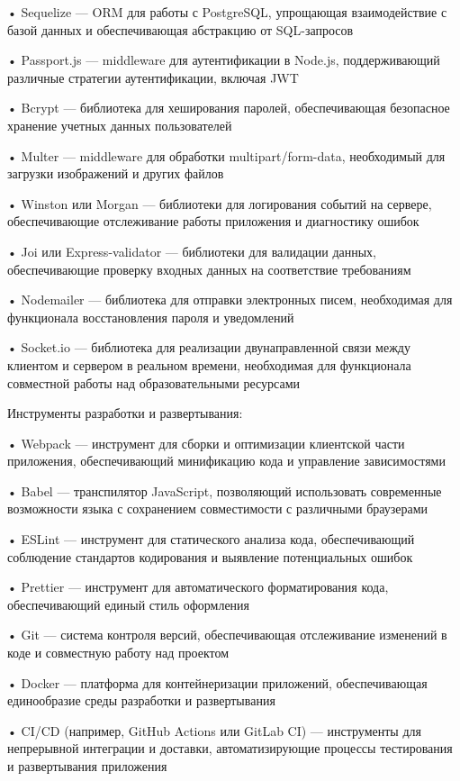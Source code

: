 {  \par \redline • Sequelize — ORM для работы с PostgreSQL, упрощающая взаимодействие с базой данных и обеспечивающая абстракцию от SQL-запросов
  \par \redline • Passport.js — middleware для аутентификации в Node.js, поддерживающий различные стратегии аутентификации, включая JWT
  \par \redline • Bcrypt — библиотека для хеширования паролей, обеспечивающая безопасное хранение учетных данных пользователей
  \par \redline • Multer — middleware для обработки multipart/form-data, необходимый для загрузки изображений и других файлов
  \par \redline • Winston или Morgan — библиотеки для логирования событий на сервере, обеспечивающие отслеживание работы приложения и диагностику ошибок
  \par \redline • Joi или Express-validator — библиотеки для валидации данных, обеспечивающие проверку входных данных на соответствие требованиям
  \par \redline • Nodemailer — библиотека для отправки электронных писем, необходимая для функционала восстановления пароля и уведомлений
  \par \redline • Socket.io — библиотека для реализации двунаправленной связи между клиентом и сервером в реальном времени, необходимая для функционала совместной работы над образовательными ресурсами

  \par \redline Инструменты разработки и развертывания:

  \par \redline • Webpack — инструмент для сборки и оптимизации клиентской части приложения, обеспечивающий минификацию кода и управление зависимостями
  \par \redline • Babel — транспилятор JavaScript, позволяющий использовать современные возможности языка с сохранением совместимости с различными браузерами
  \par \redline • ESLint — инструмент для статического анализа кода, обеспечивающий соблюдение стандартов кодирования и выявление потенциальных ошибок
  \par \redline • Prettier — инструмент для автоматического форматирования кода, обеспечивающий единый стиль оформления
  \par \redline • Git — система контроля версий, обеспечивающая отслеживание изменений в коде и совместную работу над проектом
  \par \redline • Docker — платформа для контейнеризации приложений, обеспечивающая единообразие среды разработки и развертывания
  \par \redline • CI/CD (например, GitHub Actions или GitLab CI) — инструменты для непрерывной интеграции и доставки, автоматизирующие процессы тестирования и развертывания приложения

  \par
}

